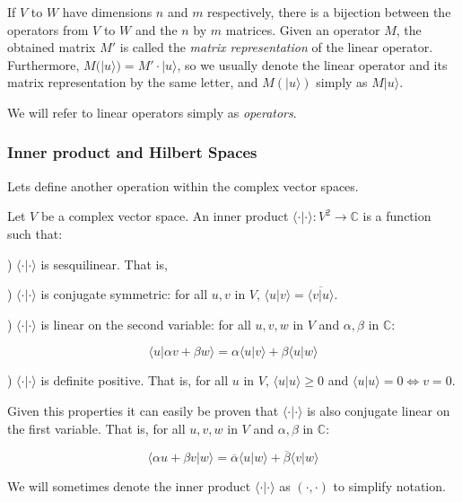 If $V$ to $W$ have dimensions $n$ and $m$ respectively, there is a bijection between the operators from $V$ to $W$ and the $n$ by $m$ matrices. Given an operator $M$, the obtained matrix $M'$ is called the \emph{matrix representation} of the linear operator. Furthermore, $M(|u\rangle) = M' \cdot |u\rangle$, so we usually denote the linear operator and its matrix representation by the same letter, and $M(|u\rangle)$ simply as $M|u\rangle$.

We will refer to linear operators simply as \emph{operators}.

\subsubsection{Inner product and Hilbert Spaces}

Lets define another operation within the complex vector spaces.

\begin{definition}
	Let $V$ be a complex vector space. An inner product $\langle \cdot | \cdot \rangle: V^2 \rightarrow \mathds{C}$ is a function such that:
	
	) $\langle \cdot | \cdot \rangle$ is sesquilinear. That is,
	
	) $\langle \cdot | \cdot \rangle$ is conjugate symmetric: for all $u,v$ in $V$, $\langle u | v \rangle = \overline{\langle v | u \rangle}$.
	
	) $\langle \cdot | \cdot \rangle$ is linear on the second variable: for all $u,v,w$ in $V$ and $\alpha, \beta$ in $\mathds{C}$:
	
	$$ \langle u  | \alpha v + \beta w \rangle = \alpha \langle u | v \rangle + \beta \langle u | w \rangle $$
	
	) $\langle \cdot | \cdot \rangle$ is definite positive. That is, for all $u$ in $V$, $\langle u | u \rangle \geq 0$ and $\langle u | u \rangle = 0 \Longleftrightarrow v = 0$.
\end{definition}

Given this properties it can easily be proven that $\langle \cdot | \cdot \rangle$ is also conjugate linear on the first variable. That is, for all $u,v,w$ in $V$ and $\alpha, \beta$ in $\mathds{C}$:

$$ \langle \alpha u + \beta v  | w \rangle = \overline{\alpha} \langle u | w \rangle + \overline{\beta} \langle v | w \rangle $$

We will sometimes denote the inner product $\langle \cdot | \cdot \rangle$ as $( \cdot , \cdot )$ to simplify notation.

